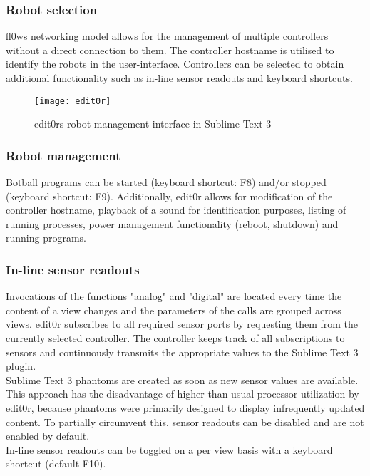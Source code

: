 \documentclass[conference]{IEEEtran}
\begin{document}
\subsubsection{Robot selection}
fl0ws\cite{fl0w:Philip Trauner} networking model allows for the management of multiple controllers without a direct connection to them. The controller hostname is utilised to identify the robots in the user-interface. Controllers can be selected to obtain additional functionality such as in-line sensor readouts and keyboard shortcuts.\\

\begin{figure}[H]
\centering
\texttt{[image: edit0r]}
\caption{edit0rs\cite{edit0r:Philip Trauner} robot management interface in Sublime Text 3\cite{Sublime Text 3:Sublime HQ}}
\label{fig:robot_management}
\end{figure}

\subsubsection{Robot management}
Botball programs can be started (keyboard shortcut: F8) and/or stopped (keyboard shortcut: F9).
Additionally, edit0r\cite{edit0r:Philip Trauner} allows for modification of the controller hostname, playback of a sound for identification purposes, listing of running processes, power management functionality (reboot, shutdown) and running programs.\\

\subsubsection{In-line sensor readouts}
Invocations of the functions "analog" and "digital" are located every time the content of a view changes and the parameters of the calls are grouped across views. edit0r\cite{edit0r:Philip Trauner} subscribes to all required sensor ports by requesting them from the currently selected controller. The controller keeps track of all subscriptions to sensors and continuously transmits the appropriate values to the Sublime Text 3\cite{Sublime Text 3:Sublime HQ} plugin. \\Sublime Text 3 \cite{Sublime Text 3:Sublime HQ} phantoms are created as soon as new sensor values are available. This approach has the disadvantage of higher than usual processor utilization by edit0r\cite{edit0r:Philip Trauner}, because phantoms were primarily designed to display infrequently updated content. To partially circumvent this, sensor readouts can be disabled and are not enabled by default.\\
In-line sensor readouts can be toggled on a per view basis with a keyboard shortcut (default F10).\\
\end{document}
